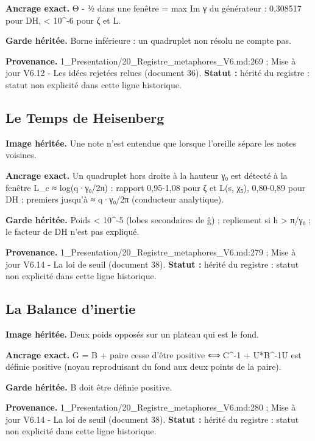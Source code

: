 \documentclass[
  9pt,
  a4paper,
]{article}
\begin{document}
\textbf{Ancrage exact.} Θ - ½ dans une fenêtre = max \textbar Im
γ\textbar{} du générateur : 0,308517 pour DH, \textless{} 10\^{}-6 pour
ζ et L.

\textbf{Garde héritée.} Borne inférieure : un quadruplet non résolu ne
compte pas.

\textbf{Provenance.} 1\_Presentation/20\_Registre\_metaphores\_V6.md:269
; Mise à jour V6.12 - Les idées rejetées relues (document 36).
\textbf{Statut :} hérité du registre : statut non explicité dans cette
ligne historique.

\hypertarget{le-temps-de-heisenberg}{%
\subsection{Le Temps de Heisenberg}\label{le-temps-de-heisenberg}}

\textbf{Image héritée.} Une note n'est entendue que lorsque l'oreille
sépare les notes voisines.

\textbf{Ancrage exact.} Un quadruplet hors droite à la hauteur γ₀ est
détecté à la fenêtre L\_c ≈ log(q·γ₀/2π) : rapport 0,95-1,08 pour ζ et
L(s, χ₅), 0,80-0,89 pour DH ; premiers jusqu'à ≈ q·γ₀/2π (conducteur
analytique).

\textbf{Garde héritée.} Poids \textless{} 10\^{}-5 (lobes secondaires de
ĝ) ; repliement si h \textgreater{} π/γ₀ ; le facteur de DH n'est pas
expliqué.

\textbf{Provenance.} 1\_Presentation/20\_Registre\_metaphores\_V6.md:279
; Mise à jour V6.14 - La loi de seuil (document 38). \textbf{Statut :}
hérité du registre : statut non explicité dans cette ligne historique.

\hypertarget{la-balance-dinertie}{%
\subsection{La Balance d'inertie}\label{la-balance-dinertie}}

\textbf{Image héritée.} Deux poids opposés sur un plateau qui est le
fond.

\textbf{Ancrage exact.} G = B + paire cesse d'être positive ⟺ C\^{}-1 +
U*B\^{}-1U est définie positive (noyau reproduisant du fond aux deux
points de la paire).

\textbf{Garde héritée.} B doit être définie positive.

\textbf{Provenance.} 1\_Presentation/20\_Registre\_metaphores\_V6.md:280
; Mise à jour V6.14 - La loi de seuil (document 38). \textbf{Statut :}
hérité du registre : statut non explicité dans cette ligne historique.
\end{document}
